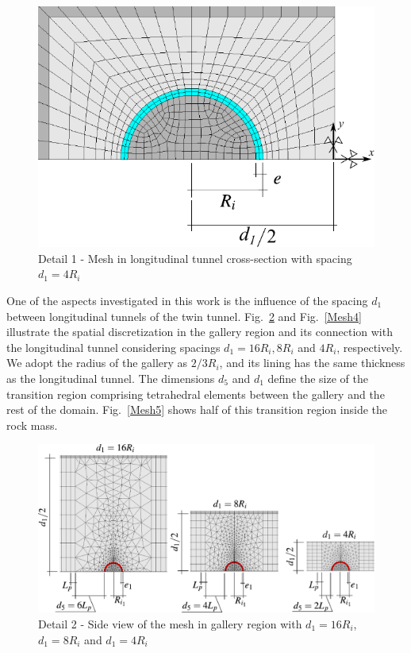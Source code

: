 \documentclass[a4paper,fleqn]{cas-sc}
\begin{document}
\begin{figure}[h!]
	\centering
	\includegraphics[scale=0.8]{Mesh2.pdf}
	\caption{Detail 1 - Mesh in longitudinal tunnel cross-section with spacing $d_1=4R_i$}
	\label{Mesh2}
\end{figure}
\FloatBarrier
One of the aspects investigated in this work is the influence of the spacing $d_1$ between longitudinal tunnels of the twin tunnel. Fig.~\ref{Mesh3} and Fig.~\ref{Mesh4} illustrate the spatial discretization in the gallery region and its connection with the longitudinal tunnel considering spacings $d_1 = 16R_i, 8R_i$ and $4R_i$, respectively. We adopt the radius of the gallery as $2/3R_i$, and its lining has the same thickness as the longitudinal tunnel. The dimensions $d_5$ and $d_1$ define the size of the transition region comprising tetrahedral elements between the gallery and the rest of the domain. Fig.~\ref{Mesh5} shows half of this transition region inside the rock mass.
\begin{figure}[h!]
	\centering
	\includegraphics[scale=0.8]{Mesh3.pdf}
	\caption{Detail 2 - Side view of the mesh in gallery region with $d_1=16R_i$, $d_1=8R_i$ and $d_1=4R_i$}
	\label{Mesh3}
\end{figure}
\end{document}
